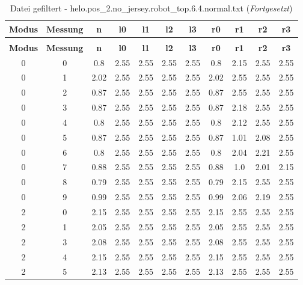 \begin{longtable}{|c|c||c||c|c|c|c||c|c|c|c|}
	\caption{Datei gefiltert - helo.pos\_2.no\_jersey.robot\_top.6.4.normal.txt} \label{tab:helo.pos-2.no-jersey.robot-top.6.4.normal.txt} \\ \hline
	\textbf{Modus} & \textbf{Messung} & \textbf{n} & \textbf{l0} & \textbf{l1} & \textbf{l2} & \textbf{l3} & \textbf{r0} & \textbf{r1} & \textbf{r2} & \textbf{r3}\\ \hline
	\endfirsthead
	\caption[]{Datei gefiltert - helo.pos\_2.no\_jersey.robot\_top.6.4.normal.txt (\emph{Fortgesetzt})} \\ \hline
	\textbf{Modus} & \textbf{Messung} & \textbf{n} & \textbf{l0} & \textbf{l1} & \textbf{l2} & \textbf{l3} & \textbf{r0} & \textbf{r1} & \textbf{r2} & \textbf{r3}\\ \hline
	\endhead
	0 & 0 & 0.8 & 2.55 & 2.55 & 2.55 & 2.55 & 0.8 & 2.15 & 2.55 & 2.55 \\ \hline
	0 & 1 & 2.02 & 2.55 & 2.55 & 2.55 & 2.55 & 2.02 & 2.55 & 2.55 & 2.55 \\ \hline
	0 & 2 & 0.87 & 2.55 & 2.55 & 2.55 & 2.55 & 0.87 & 2.55 & 2.55 & 2.55 \\ \hline
	0 & 3 & 0.87 & 2.55 & 2.55 & 2.55 & 2.55 & 0.87 & 2.18 & 2.55 & 2.55 \\ \hline
	0 & 4 & 0.8 & 2.55 & 2.55 & 2.55 & 2.55 & 0.8 & 2.12 & 2.55 & 2.55 \\ \hline
	0 & 5 & 0.87 & 2.55 & 2.55 & 2.55 & 2.55 & 0.87 & 1.01 & 2.08 & 2.55 \\ \hline
	0 & 6 & 0.8 & 2.55 & 2.55 & 2.55 & 2.55 & 0.8 & 2.04 & 2.21 & 2.55 \\ \hline
	0 & 7 & 0.88 & 2.55 & 2.55 & 2.55 & 2.55 & 0.88 & 1.0 & 2.01 & 2.15 \\ \hline
	0 & 8 & 0.79 & 2.55 & 2.55 & 2.55 & 2.55 & 0.79 & 2.15 & 2.55 & 2.55 \\ \hline
	0 & 9 & 0.99 & 2.55 & 2.55 & 2.55 & 2.55 & 0.99 & 2.06 & 2.19 & 2.55 \\ \hline
	2 & 0 & 2.15 & 2.55 & 2.55 & 2.55 & 2.55 & 2.15 & 2.55 & 2.55 & 2.55 \\ \hline
	2 & 1 & 2.05 & 2.55 & 2.55 & 2.55 & 2.55 & 2.05 & 2.55 & 2.55 & 2.55 \\ \hline
	2 & 3 & 2.08 & 2.55 & 2.55 & 2.55 & 2.55 & 2.08 & 2.55 & 2.55 & 2.55 \\ \hline
	2 & 4 & 2.15 & 2.55 & 2.55 & 2.55 & 2.55 & 2.15 & 2.55 & 2.55 & 2.55 \\ \hline
	2 & 5 & 2.13 & 2.55 & 2.55 & 2.55 & 2.55 & 2.13 & 2.55 & 2.55 & 2.55 \\ \hline

\end{longtable}
